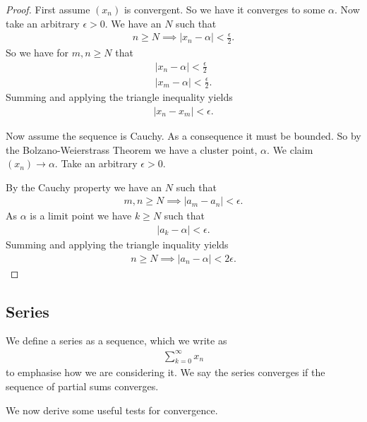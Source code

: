 \documentclass[]{article}
\begin{document}
\begin{proof}
		First assume $(x_n)$ is convergent. So we have it converges to some $\alpha$. Now take an arbitrary $\epsilon > 0$. We have an $N$ such that
		\begin{align*}
				n \geq N \implies |x_n - \alpha| < \frac{\epsilon}{2}.
		\end{align*}
		So we have for $m,n \geq N$ that
		\begin{align*}
				|x_n - \alpha| < \frac{\epsilon}{2} \\
				|x_m - \alpha| < \frac{\epsilon}{2}.
		\end{align*}
		Summing and applying the triangle inequality yields 
		\begin{align*}
				|x_n - x_m| < \epsilon.
		\end{align*}

		Now assume the sequence is Cauchy. As a consequence it must be bounded. So by the Bolzano-Weierstrass Theorem we have a cluster point, $\alpha$. We claim $(x_n) \to \alpha$. Take an arbitrary $\epsilon > 0$. 

		By the Cauchy property we have an $N$ such that
		\begin{align*}
			m,n \geq N \implies |a_m - a_n| < \epsilon.
		\end{align*}
		As $\alpha $ is a limit point we have $k \geq N$ such that
		\begin{align*}
				|a_k - \alpha| < \epsilon.
		\end{align*}
		Summing and applying the triangle inquality yields 
		\begin{align*}
				n \geq N \implies |a_n - \alpha| < 2\epsilon.
		\end{align*}
\end{proof}

\subsection{Series}

\begin{defi} [Series]
	We define a series as a sequence, which we write as
	\begin{align*}
			\sum_{k=0}^\infty x_n
	\end{align*}
	to emphasise how we are considering it. We say the series converges if the sequence of partial sums converges.
\end{defi}

We now derive some useful tests for convergence.
\end{document}
